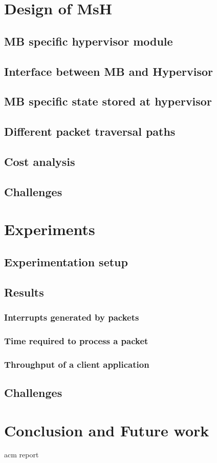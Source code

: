 \documentclass[a4paper,11pt]{report}
\begin{document}
\chapter{Design of MsH}
\section{MB specific hypervisor module}
\section{Interface between MB and Hypervisor}
\section{MB specific state stored at hypervisor}
\section{Different packet traversal paths}
\section{Cost analysis}
\section{Challenges}

\chapter{Experiments}
\section{Experimentation setup}
\section{Results}
\subsection{Interrupts generated by packets}
\subsection{Time required to process a packet}
\subsection{Throughput of a client application}
\section{Challenges}

\chapter{Conclusion and Future work}

\newpage
 {acm}
 {report}
\end{document}
